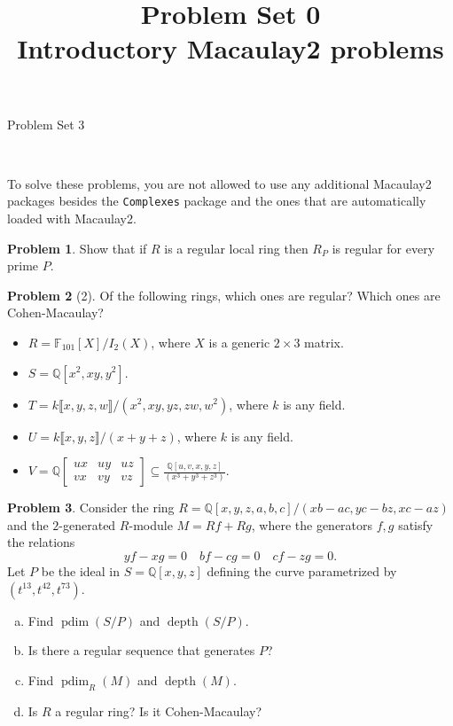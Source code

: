 \documentclass[11pt]{article}
\title{}
\date{\vspace{-0.5in}}
\title{Problem Set 0 \\ Introductory Macaulay2 problems}
\DeclareMathOperator{\depth}{depth}
\DeclareMathOperator{\pdim}{pdim}
\theoremstyle{definition}
\newtheorem{problem}{Problem}
\begin{document}
\thispagestyle{fancy}
\pagestyle{fancy}


\begin{center}
	{\LARGE Problem Set 3\\
	
	
}
\end{center}

\

To solve these problems, you are not allowed to use any additional Macaulay2 packages besides the \texttt{Complexes} package and the ones that are automatically loaded with Macaulay2.

\begin{problem}
	Show that if $R$ is a regular local ring then $R_P$ is regular for every prime $P$.
\end{problem}



\begin{problem}[2]
	Of the following rings, which ones are regular? Which ones are Cohen-Macaulay?
	\begin{itemize}
		\item $R = \mathbb{F}_{101}[ X ]/I_2(X)$, where $X$ is a generic $2 \times 3$ matrix.
		\item $S = \mathbb{Q}[x^2,xy,y^2]$.
		\item $T = k \llbracket x,y,z,w \rrbracket/(x^2,xy,yz,zw,w^2)$, where $k$ is any field.
		\item $U = k \llbracket x,y,z \rrbracket /(x+y+z)$, where $k$ is any field.
		\item $V = \mathbb{Q} \begin{bmatrix} ux & uy & uz \\ vx & vy & vz \end{bmatrix} \subseteq \frac{\mathbb{Q}[u,v,x,y,z]}{(x^3+y^3+z^3)}$.
	\end{itemize}
\end{problem}



\begin{problem}
	Consider the ring $R = \mathbb{Q}[x,y,z,a,b,c]/(xb-ac,yc-bz,xc-az)$ and the $2$-generated $R$-module $M = Rf + Rg$, where the generators $f, g$ satisfy the relations 
		$$yf-xg = 0 \quad bf - cg = 0 \quad cf - zg = 0.$$
		Let $P$ be the ideal in $S = \mathbb{Q}[x,y,z]$ defining the curve parametrized by $(t^{13},t^{42},t^{73})$.

\begin{enumerate}[a)]
	\item Find $\pdim(S/P)$ and $\depth(S/P)$.
	\item Is there a regular sequence that generates $P$?
	\item Find $\pdim_R(M)$ and $\depth(M)$.
	\item Is $R$ a regular ring? Is it Cohen-Macaulay?
\end{enumerate}
\end{problem}
\end{document}
